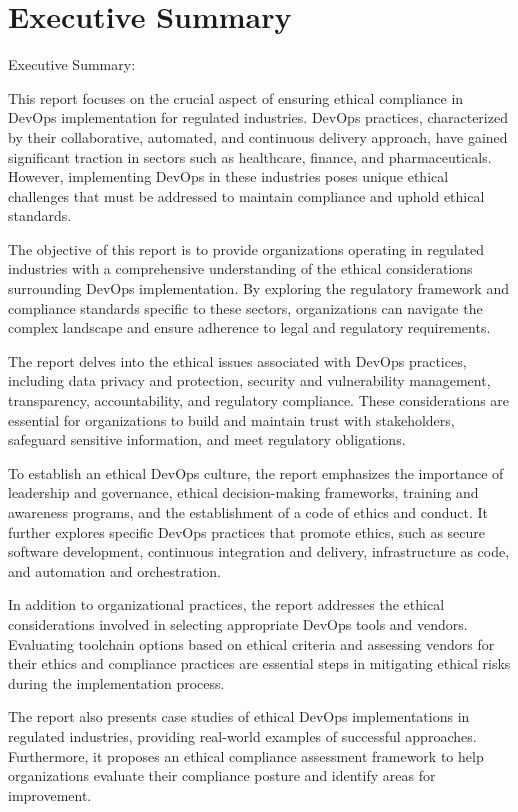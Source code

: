 \chapter*{Executive Summary}

Executive Summary:

This report focuses on the crucial aspect of ensuring ethical compliance in DevOps implementation for regulated industries. DevOps practices, characterized by their collaborative, automated, and continuous delivery approach, have gained significant traction in sectors such as healthcare, finance, and pharmaceuticals. However, implementing DevOps in these industries poses unique ethical challenges that must be addressed to maintain compliance and uphold ethical standards.

The objective of this report is to provide organizations operating in regulated industries with a comprehensive understanding of the ethical considerations surrounding DevOps implementation. By exploring the regulatory framework and compliance standards specific to these sectors, organizations can navigate the complex landscape and ensure adherence to legal and regulatory requirements.

The report delves into the ethical issues associated with DevOps practices, including data privacy and protection, security and vulnerability management, transparency, accountability, and regulatory compliance. These considerations are essential for organizations to build and maintain trust with stakeholders, safeguard sensitive information, and meet regulatory obligations.

To establish an ethical DevOps culture, the report emphasizes the importance of leadership and governance, ethical decision-making frameworks, training and awareness programs, and the establishment of a code of ethics and conduct. It further explores specific DevOps practices that promote ethics, such as secure software development, continuous integration and delivery, infrastructure as code, and automation and orchestration.

In addition to organizational practices, the report addresses the ethical considerations involved in selecting appropriate DevOps tools and vendors. Evaluating toolchain options based on ethical criteria and assessing vendors for their ethics and compliance practices are essential steps in mitigating ethical risks during the implementation process.

The report also presents case studies of ethical DevOps implementations in regulated industries, providing real-world examples of successful approaches. Furthermore, it proposes an ethical compliance assessment framework to help organizations evaluate their compliance posture and identify areas for improvement.

